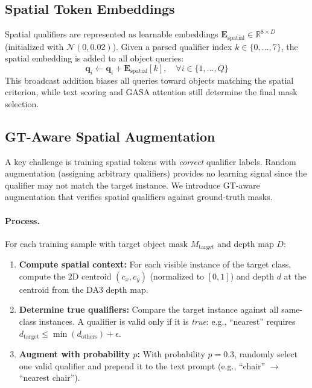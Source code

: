 \subsection{Spatial Token Embeddings}

Spatial qualifiers are represented as learnable embeddings $\mathbf{E}_{\text{spatial}} \in \mathbb{R}^{8 \times D}$ (initialized with $\mathcal{N}(0, 0.02)$). Given a parsed qualifier index $k \in \{0, \ldots, 7\}$, the spatial embedding is added to all object queries:
\begin{equation}
\mathbf{q}_i \leftarrow \mathbf{q}_i + \mathbf{E}_{\text{spatial}}[k], \quad \forall i \in \{1, \ldots, Q\}
\end{equation}
This broadcast addition biases all queries toward objects matching the spatial criterion, while text scoring and GASA attention still determine the final mask selection.

\subsection{GT-Aware Spatial Augmentation}
\label{app:spatial_gtaware}

A key challenge is training spatial tokens with \emph{correct} qualifier labels. Random augmentation (assigning arbitrary qualifiers) provides no learning signal since the qualifier may not match the target instance. We introduce GT-aware augmentation that verifies spatial qualifiers against ground-truth masks.

\paragraph{Process.}
For each training sample with target object mask $M_{\text{target}}$ and depth map $D$:
\begin{enumerate}[nosep,leftmargin=*]
    \item \textbf{Compute spatial context:} For each visible instance of the target class, compute the 2D centroid $(c_x, c_y)$ (normalized to $[0,1]$) and depth $d$ at the centroid from the DA3 depth map.
    \item \textbf{Determine true qualifiers:} Compare the target instance against all same-class instances. A qualifier is valid only if it is \emph{true}: e.g., ``nearest'' requires $d_{\text{target}} \leq \min(d_{\text{others}}) + \epsilon$.
    \item \textbf{Augment with probability $p$:} With probability $p=0.3$, randomly select one valid qualifier and prepend it to the text prompt (e.g., ``chair'' $\to$ ``nearest chair'').
\end{enumerate}

